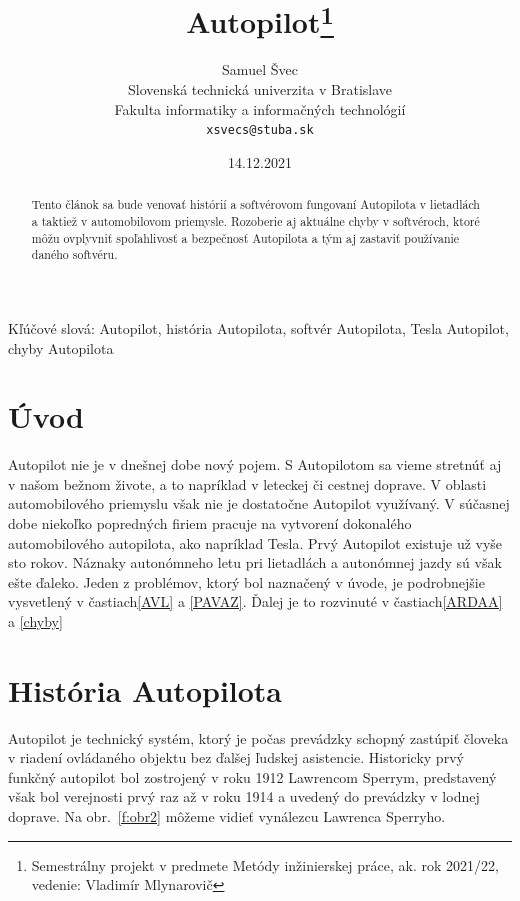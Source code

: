 \documentclass[10pt,twoside,slovak,a4paper]{article}
\title{Autopilot\thanks{Semestrálny projekt v predmete Metódy inžinierskej práce, ak. rok 2021/22, vedenie: Vladimír Mlynarovič}} %
\author{Samuel Švec\\[2pt]
	{\small Slovenská technická univerzita v Bratislave}\\
	{\small Fakulta informatiky a informačných technológií}\\
	{\small \texttt{xsvecs@stuba.sk}}
	}
\date{\small 14.12.2021} %
\begin{document}
\maketitle

\begin{abstract}
Tento článok sa bude venovať histórií a softvérovom fungovaní Autopilota v lietadlách a taktiež v automobilovom priemysle. Rozoberie aj aktuálne chyby v softvéroch, ktoré môžu ovplyvniť spoľahlivosť a bezpečnosť Autopilota a tým aj zastaviť používanie daného softvéru.
\end{abstract}

Kľúčové slová: Autopilot, história Autopilota, softvér Autopilota, Tesla Autopilot, chyby Autopilota

\section{Úvod}

Autopilot nie je v dnešnej dobe nový pojem. S Autopilotom sa vieme stretnúť aj v našom bežnom živote, a to napríklad v leteckej či cestnej doprave. V oblasti automobilového priemyslu však nie je dostatočne Autopilot využívaný. V súčasnej dobe niekoľko popredných firiem pracuje na vytvorení dokonalého automobilového autopilota, ako napríklad Tesla. Prvý Autopilot existuje už vyše sto rokov. Náznaky autonómneho letu pri lietadlách a autonómnej jazdy sú však ešte ďaleko. Jeden z problémov, ktorý bol naznačený v úvode, je podrobnejšie vysvetlený v častiach\ref{AVL} a \ref{PAVAZ}.
Ďalej je to rozvinuté v častiach\ref{ARDAA} a \ref{chyby} 

\section{História Autopilota} \label{ALD}

Autopilot je technický systém, ktorý je počas prevádzky schopný zastúpiť človeka v riadení ovládaného objektu bez ďalšej ľudskej asistencie. Historicky prvý funkčný autopilot bol zostrojený v roku 1912 Lawrencom Sperrym, predstavený však bol verejnosti prvý raz až v roku 1914 a uvedený do prevádzky v lodnej doprave.\cite{HistoryAutopilot} Na obr.~\ref{f:obr2} môžeme vidieť vynálezcu Lawrenca Sperryho.
\end{document}
